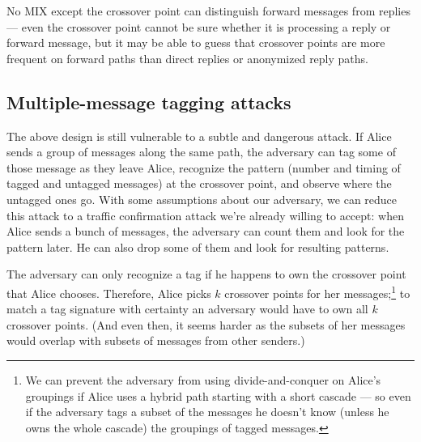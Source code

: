 \documentclass[11pt]{IEEEtran}
\begin{document}
No MIX except the crossover point can distinguish forward messages from
replies --- even the crossover point cannot be sure whether it is processing
a reply or forward message, but it may be able to guess that crossover
points are more frequent on forward paths than direct replies or
anonymized reply paths.

\subsection{Multiple-message tagging attacks}
\label{subsec:multi-tagging}

The above design is still vulnerable to a subtle and dangerous
attack. If Alice sends a group of messages along the same path, the
adversary can tag some of those message as they leave Alice, recognize
the pattern (number and timing of tagged and untagged messages) at the
crossover point, and observe where the untagged ones go.
With some assumptions about our adversary, we can reduce
this attack to a traffic confirmation attack we're already willing to
accept: when Alice sends a bunch of messages, the adversary can count
them and look for the pattern later. He can also drop some of them and
look for resulting patterns.

The adversary can only recognize a tag if he happens to own the crossover
point that Alice chooses.
Therefore, Alice picks $k$ crossover points for her
messages;\footnote{
  We can prevent the adversary from using divide-and-conquer on Alice's
  groupings if Alice uses a hybrid path starting with a short cascade ---
  so even if the adversary tags a subset of the messages he doesn't know
  (unless he owns the whole cascade) the groupings of tagged messages.
}
to match a tag signature with certainty an adversary would
have to own all $k$ crossover points.  (And even then, it seems harder
as the subsets of her messages would overlap with subsets of
messages from other senders.)

\end{document}
